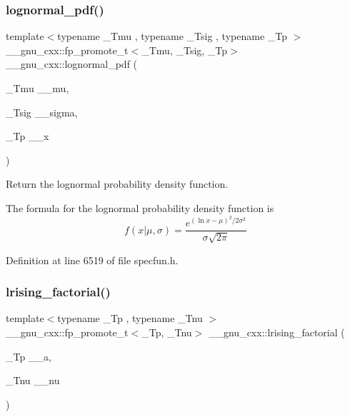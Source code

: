 \subsubsection{\texorpdfstring{lognormal\+\_\+pdf()}{lognormal\_pdf()}}
{\footnotesize\ttfamily template$<$typename \+\_\+\+Tmu , typename \+\_\+\+Tsig , typename \+\_\+\+Tp $>$ \\
\+\_\+\+\_\+gnu\+\_\+cxx\+::fp\+\_\+promote\+\_\+t$<$\+\_\+\+Tmu, \+\_\+\+Tsig, \+\_\+\+Tp$>$ \+\_\+\+\_\+gnu\+\_\+cxx\+::lognormal\+\_\+pdf (\begin{DoxyParamCaption}\item[{\+\_\+\+Tmu}]{\+\_\+\+\_\+mu,  }\item[{\+\_\+\+Tsig}]{\+\_\+\+\_\+sigma,  }\item[{\+\_\+\+Tp}]{\+\_\+\+\_\+x }\end{DoxyParamCaption})\hspace{0.3cm}{\ttfamily [inline]}}



Return the lognormal probability density function. 

The formula for the lognormal probability density function is \[ f(x|\mu,\sigma) = \frac{e^{(\ln{x}-\mu)^2/2\sigma^2}}{\sigma\sqrt{2\pi}} \] 

Definition at line 6519 of file specfun.\+h.

\mbox{\label{group__gnu__math__spec__func_ga8912b75b2f7592fb61128c766e7313b9}} 
\subsubsection{\texorpdfstring{lrising\+\_\+factorial()}{lrising\_factorial()}}
{\footnotesize\ttfamily template$<$typename \+\_\+\+Tp , typename \+\_\+\+Tnu $>$ \\
\+\_\+\+\_\+gnu\+\_\+cxx\+::fp\+\_\+promote\+\_\+t$<$\+\_\+\+Tp, \+\_\+\+Tnu$>$ \+\_\+\+\_\+gnu\+\_\+cxx\+::lrising\+\_\+factorial (\begin{DoxyParamCaption}\item[{\+\_\+\+Tp}]{\+\_\+\+\_\+a,  }\item[{\+\_\+\+Tnu}]{\+\_\+\+\_\+nu }\end{DoxyParamCaption})\hspace{0.3cm}{\ttfamily [inline]}}



